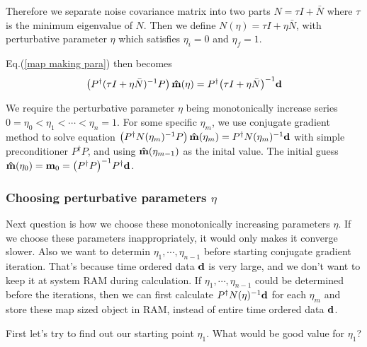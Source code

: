 \documentclass[11pt, letterpaper]{article}
\newcommand{\vbd}{\vb{d}}
\newcommand{\vbm}{\vb{m}}
\newcommand{\inv}[1]{#1^{-1}}
\newcommand{\hatm}{\vb{\hat{m}}}
\newcommand{\Pdagger}{P^{\dagger}}
\newcommand{\Nbar}{\bar{N}}
\newcommand{\PPinv}[1]{\inv{\qty(\Pdagger #1 P)}}
\begin{document}
Therefore we separate noise covariance matrix into two parts
$N = \tau I + \Nbar$ where $\tau$ is the minimum eigenvalue of $N$. 
Then we define $N(\eta) = \tau I + \eta \Nbar$, 
with perturbative parameter $\eta$ which satisfies $\eta_i = 0$ and $\eta_f=1$.

Eq.(\ref{map making para}) then becomes
\begin{align}
\qty(\Pdagger \inv{(\tau I + \eta \Nbar)}P) \, \hatm(\eta) 
= \Pdagger \inv{\qty(\tau I + \eta \Nbar)} \vbd \label{map making perturb} 
\end{align}

We require the perturbative parameter $\eta$ being monotonically increase
series $0 = \eta_0 < \eta_1 < \cdots < \eta_n = 1$.
For some specific $\eta_m$, we use conjugate gradient method to solve equation 
$\qty(\Pdagger \inv{N(\eta_m)} P)\, 
\hatm(\eta_m) = \Pdagger \inv{N(\eta_m)} \vbd$
with simple preconditioner $\Pdagger P$,
and using $\hatm(\eta_{m-1})$ as the inital value.
The initial guess $\hatm(\eta_0) = \vbm_0 = \PPinv{} \Pdagger \vbd$.


\subsubsection{Choosing perturbative parameters $\eta$}
Next question is how we choose these monotonically increasing parameters
$\eta$. 
If we choose these parameters inappropriately, it would only makes it converge
slower.
Also we want to determin $\eta_1, \cdots, \eta_{n-1}$ before starting conjugate
gradient iteration.
That's because time ordered data $\vbd$ is very large,
and we don't want to keep it at system RAM during calculation.
If $\eta_1, \cdots, \eta_{n-1}$ could be determined before the iterations, 
then we can first calculate $\Pdagger \inv{N(\eta)} \vbd$ for each $\eta_m$
and store these map sized object in RAM,
instead of entire time ordered data $\vbd$.

First let's try to find out our starting point $\eta_1$.
What would be good value for $\eta_1$?
\end{document}
